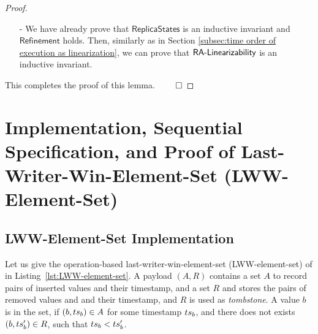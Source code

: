\begin {proof}
\begin{itemize}
\begin{itemize}
    By the causal delivery assumption, if $\alabel$ is visible to an operation $\alabel'$, then the effector of $\alabel'$ has not been applied in $S'$ yet; if an operation $\alabel''$ is visible to $\alabel$, then the effector of $\alabel''$ has already been applied in $S'$. By Annotation1 of effector $(A_a,R_a)$, and Annotation2 of replica state $S$, we can see that $A_a \setminus \{ a \} \subseteq A$ and $R_a \subseteq R$, and thus, we can see that $A' = A \cup \{ a \}$ and $R' = R$. Therefore, we have that $S' = \abstate'$.

    \item[-] The cases of {\tt remove} can be similarly proved.

    \item[-] Applying the query $\alabelshort[read]{}$ on the replica state $S$ should result in the same return value as applying the same query in the context of the specification on the same state $\abstate = \refmap(S)$, which again holds trivially.
    \end{itemize}

\item[-] We have already prove that $\mathsf{ReplicaStates}$ is an inductive invariant and $\mathsf{Refinement}$ holds. Then, similarly as in Section \ref{subsec:time order of execution as linearization}, we can prove that $\mathsf{RA\text{-}Linearizability{}}$ is an inductive invariant.
\end{itemize}

This completes the proof of this lemma. $\qed$
\end {proof}






\section{Implementation, Sequential Specification, and Proof of Last-Writer-Win-Element-Set (LWW-Element-Set)}
\label{sec:implementation, sequential specification, and proof of last-writer-win-element-set (LWW-element-set)}


\subsection{LWW-Element-Set Implementation}
\label{subsec:LWW-element-set implementation}

Let us give the operation-based last-writer-win-element-set (LWW-element-set) of \cite{ShapiroPBZ11} in Listing~\ref{lst:LWW-element-set}. A payload $(A,R)$ contains a set $A$ to record pairs of inserted values and their timestamp, and a set $R$ and stores the pairs of removed values and and their timestamp, and $R$ is used as \emph{tombstone}. A value $b$ is in the set, if $(b,ts_b) \in A$ for some timestamp $ts_b$, and there does not exists $(b,ts'_b) \in R$, such that $ts_b < ts'_b$.


